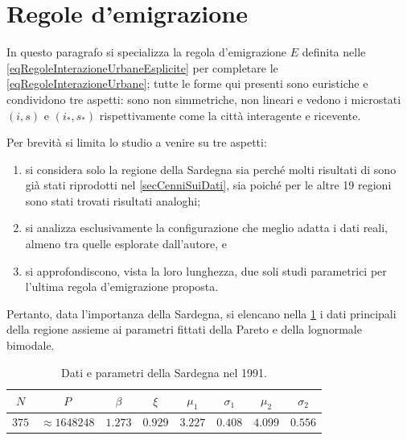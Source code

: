   \section{Regole d'emigrazione}\label{secRegoleEmigrazione}

    In questo paragrafo si specializza la regola d'emigrazione \(E\) definita nelle \ref{eqRegoleInterazioneUrbaneEsplicite} per completare le \ref{eqRegoleInterazioneUrbane}; tutte le forme qui presenti sono euristiche e condividono tre aspetti: sono non simmetriche, non lineari e vedono i microstati \((i,s)\) e \((i_*,s_*)\) rispettivamente come la città interagente e ricevente.

    Per brevità si limita lo studio a venire su tre aspetti:

    \begin{enumerate}[
      label=\arabic*.,
    ]
      \item si considera solo la regione della Sardegna sia perché molti risultati di \cite{DeMontis2007} sono già stati riprodotti nel \cref{secCenniSuiDati}, sia poiché per le altre 19 regioni sono stati trovati risultati analoghi;
      \item si analizza esclusivamente la configurazione che meglio adatta i dati reali, almeno tra quelle esplorate dall'autore, e
      \item si approfondiscono, vista la loro lunghezza, due soli studi parametrici per l'ultima regola d'emigrazione proposta.
    \end{enumerate}
    
    Pertanto, data l'importanza della Sardegna, si elencano nella \cref{tabDatiParametriSardegna} i dati principali della regione assieme ai parametri fittati della Pareto e della lognormale bimodale.

    \begin{table}[htb]
      \centering
      \caption{Dati \cite{ISTATCensimento1991,ISTATPendolarismo1991} e parametri della Sardegna nel 1991.}
      \begin{tabular}{cccccccc}
        \hline
        \(N\)&\(P\)&\(\beta\)&\(\xi\)&
        \(\mu_1\)&\(\sigma_1\)&\(\mu_2\)&\(\sigma_2\)\\
        \hline
        \(\num{375}\)&\(\approx\num{1648248}\)&\(\num{1.273}\)&\(\num{0.929}\)&
        \(\num{3.227}\)&\(\num{0.408}\)&\(\num{4.099}\)&\(\num{0.556}\)\\
        \hline
      \end{tabular}
      \label{tabDatiParametriSardegna}
    \end{table}

